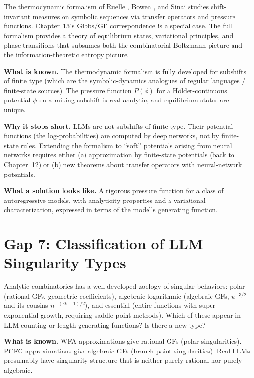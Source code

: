 The thermodynamic formalism of Ruelle \cite{Ruelle1978}, Bowen \cite{Bowen1975}, and Sinai studies shift-invariant measures on symbolic sequences via transfer operators and pressure functions. Chapter~13's Gibbs/GF correspondence is a special case. The full formalism provides a theory of equilibrium states, variational principles, and phase transitions that subsumes both the combinatorial Boltzmann picture and the information-theoretic entropy picture.

\textbf{What is known.} The thermodynamic formalism is fully developed for subshifts of finite type (which are the symbolic-dynamics analogues of regular languages / finite-state sources). The pressure function $P(\phi)$ for a H\"older-continuous potential $\phi$ on a mixing subshift is real-analytic, and equilibrium states are unique.

\textbf{Why it stops short.} LLMs are not subshifts of finite type. Their potential functions (the log-probabilities) are computed by deep networks, not by finite-state rules. Extending the formalism to ``soft'' potentials arising from neural networks requires either (a) approximation by finite-state potentials (back to Chapter~12) or (b) new theorems about transfer operators with neural-network potentials.

\textbf{What a solution looks like.} A rigorous pressure function for a class of autoregressive models, with analyticity properties and a variational characterization, expressed in terms of the model's generating function.

\section{Gap 7: Classification of LLM Singularity Types}
\label{ch18:gap7}

Analytic combinatorics has a well-developed zoology of singular behaviors: polar (rational GFs, geometric coefficients), algebraic-logarithmic (algebraic GFs, $n^{-3/2}$ and its cousins $n^{-(2k+1)/2}$), and essential (entire functions with super-exponential growth, requiring saddle-point methods). Which of these appear in LLM counting or length generating functions? Is there a new type?

\textbf{What is known.} WFA approximations give rational GFs (polar singularities). PCFG approximations give algebraic GFs (branch-point singularities). Real LLMs presumably have singularity structure that is neither purely rational nor purely algebraic.

